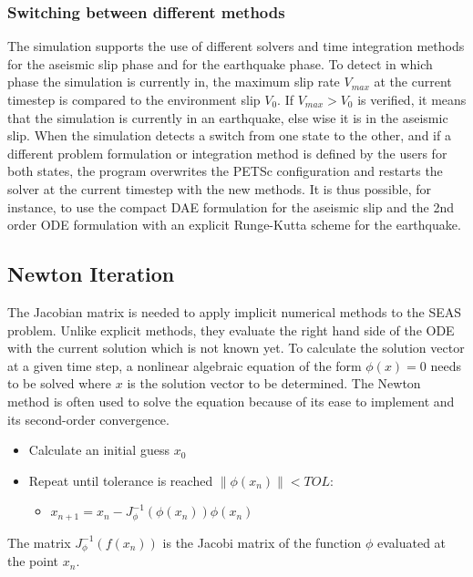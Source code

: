 \subsubsection{Switching between different methods}
The simulation supports the use of different solvers and time integration methods for the aseismic slip phase and for the earthquake phase. To detect in which phase the simulation is currently in, the maximum slip rate $V_{max}$ at the current timestep is compared to the environment slip $V_0$. If $V_{max}>V_0$ is verified, it means that the simulation is currently in an earthquake, else wise it is in the aseismic slip. When the simulation detects a switch from one state to the other, and if a different problem formulation or integration method is defined by the users for both states, the program overwrites the PETSc configuration and restarts the solver at the current timestep with the new methods. It is thus possible, for instance, to use the compact DAE formulation for the aseismic slip and the 2nd order ODE formulation with an explicit Runge-Kutta scheme for the earthquake. 

\subsection{Newton Iteration}
\label{ssec:ConvergenceNewtonIteration}
The Jacobian matrix is needed to apply implicit numerical methods to the SEAS problem. Unlike explicit methods, they evaluate the right hand side of the ODE with the current solution which is not known yet. To calculate the solution vector at a given time step, a nonlinear algebraic equation of the form $\phi(x) = 0$ needs to be solved where $x$ is the solution vector to be determined. The Newton method is often used to solve the equation because of its ease to implement and its second-order convergence. 

\begin{itemize}
	\item Calculate an initial guess $x_0$
	\item Repeat until tolerance is reached $\|\phi(x_n)\| < TOL$: 
	\begin{itemize}
		\item $x_{n+1} = x_n - J_\phi^{-1}(\phi(x_n)) \phi(x_n)$
	\end{itemize} 
\end{itemize}

The matrix $J_\phi^{-1}(f(x_n))$ is the Jacobi matrix of the function $\phi$ evaluated at the point $x_n$. \\

